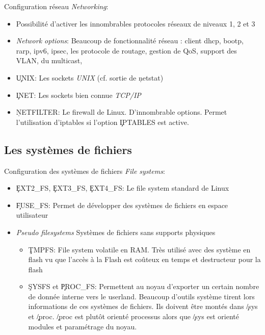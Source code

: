 \begin{frame}[fragile=singleslide]{Configuration réseau}
  \emph{Networking}:
  \begin{itemize}
  \item Possibilité  d'activer les innombrables  protocoles réseaux de
    niveaux 1, 2 et 3
  \item  \emph{Network options}: Beaucoup  de fonctionnalité  réseau :
    client dhcp,  bootp, rarp, ipv6, ipsec, les  protocole de routage,
    gestion de QoS, support des VLAN, du multicast,
  \item \c{UNIX}: Les sockets \emph{UNIX} (cf. sortie de \c{netstat})
  \item \c{INET}: Les sockets bien connue \emph{TCP/IP}
  \item \c{NETFILTER}:  Le firewall de  Linux.  D'innombrable options.
    Permet  l'utilisation  d'iptables  si  l'option  \c{IPTABLES}  est
    active.
  \end{itemize} 
\end{frame}

\subsection{Les systèmes de fichiers}

\begin{frame}[fragile=singleslide]{Configuration des systèmes de fichiers}
  \emph{File systems}:
  \begin{itemize}
  \item  \c{EXT2_FS},   \c{EXT3_FS},  \c{EXT4_FS}: Le   file  system
    standard de Linux
  \item \c{FUSE_FS}: Permet de  développer des systèmes de fichiers en
    espace utilisateur
  \item \emph{Pseudo  filesystems} Systèmes de  fichiers sans supports
    physiques
    \begin{itemize} 
    \item \c{TMPFS}: File system  volatile en RAM.  Très utilisé avec
      des système en flash vu que  l'accès à la Flash est coûteux en
      temps et destructeur pour la flash
    \item \c{SYSFS} et \c{PROC_FS}:  Permettent au noyau d'exporter un
      certain  nombre de  donnée interne  vers le  userland.  Beaucoup
      d'outils  système tirent  lors informations  de ces  systèmes de
      fichiers.  Ils  doivent être montés dans  \c{/sys} et \c{/proc}.
      \c{/proc} est  plutôt orienté  processus alors que  \c{/sys} est
      orienté modules et paramétrage du noyau.
    \end{itemize} 
  \end{itemize}
\end{frame}

